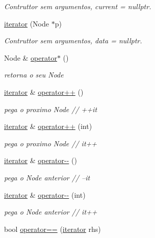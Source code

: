 \begin{DoxyCompactItemize}
\begin{DoxyCompactList}\small\item\em Contruttor sem argumentos, current = nullptr. \end{DoxyCompactList}\item 
\hyperlink{classsc_1_1list_1_1iterator_a818795d7651516a93e563f3229e86351}{iterator} (Node $\ast$p)
\begin{DoxyCompactList}\small\item\em Contruttor sem argumentos, data = nullptr. \end{DoxyCompactList}\item 
Node \& \hyperlink{classsc_1_1list_1_1iterator_a4d78771f058ed50c0b0f1d6b0abb4158}{operator$\ast$} ()
\begin{DoxyCompactList}\small\item\em retorna o seu Node \end{DoxyCompactList}\item 
\hyperlink{classsc_1_1list_1_1iterator}{iterator} \& \hyperlink{classsc_1_1list_1_1iterator_aed5c46c8e0c470a9eccb5e47d0c80f4c}{operator++} ()
\begin{DoxyCompactList}\small\item\em pega o proximo Node // ++it \end{DoxyCompactList}\item 
\hyperlink{classsc_1_1list_1_1iterator}{iterator} \& \hyperlink{classsc_1_1list_1_1iterator_aae8f9a01b9f0d1c08d08dd3ce4dab8e1}{operator++} (int)
\begin{DoxyCompactList}\small\item\em pega o proximo Node // it++ \end{DoxyCompactList}\item 
\hyperlink{classsc_1_1list_1_1iterator}{iterator} \& \hyperlink{classsc_1_1list_1_1iterator_abf189d629eae1b86654039bc923f3979}{operator-\/-\/} ()
\begin{DoxyCompactList}\small\item\em pega o Node anterior // --it \end{DoxyCompactList}\item 
\hyperlink{classsc_1_1list_1_1iterator}{iterator} \& \hyperlink{classsc_1_1list_1_1iterator_a2992198da72ea765c7c63f851b482817}{operator-\/-\/} (int)
\begin{DoxyCompactList}\small\item\em pega o Node anterior // it++ \end{DoxyCompactList}\item 
bool \hyperlink{classsc_1_1list_1_1iterator_a8be9449fec80c12bd0f38fc7927848bc}{operator==} (\hyperlink{classsc_1_1list_1_1iterator}{iterator} rhs)

\end{DoxyCompactItemize}
